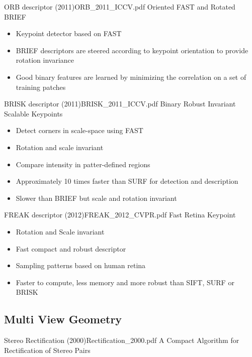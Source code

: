 \documentclass[10pt,a4paper]{scrartcl}
\begin{document}
\begin{multicols*}{2}
\begin{Paper}{ORB descriptor (2011)}{ORB_2011_ICCV.pdf}
Oriented FAST and Rotated BRIEF

\begin{itemize}
\item Keypoint detector based on FAST
\item BRIEF descriptors are steered according to keypoint orientation to provide rotation invariance
\item Good binary features are learned by minimizing the correlation on a set of training patches
\end{itemize}
\end{Paper}

\begin{Paper}{BRISK descriptor (2011)}{BRISK_2011_ICCV.pdf}
Binary Robust Invariant Scalable Keypoints

\begin{itemize}
\item Detect corners in scale-space using FAST
\item Rotation and scale invariant
\item Compare intensity in patter-defined regions
\item Approximately 10 times faster than SURF for detection and description
\item Slower than BRIEF but scale and rotation invariant
\end{itemize}
\end{Paper}

\begin{Paper}{FREAK descriptor (2012)}{FREAK_2012_CVPR.pdf}
Fast Retina Keypoint

\begin{itemize}
\item Rotation and Scale invariant
\item Fast compact and robust descriptor
\item Sampling patterns based on human retina
\item Faster to compute, less memory and more robust than SIFT, SURF or BRISK
\end{itemize}
\end{Paper}

\subsection{Multi View Geometry}

\begin{Paper}{Stereo Rectification (2000)}{Rectification_2000.pdf}
A Compact Algorithm for Rectification of Stereo Pairs
\end{Paper}


\end{multicols*}
\end{document}
